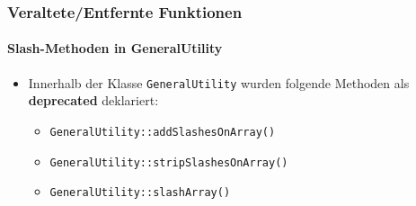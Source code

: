 %

\begin{frame}[fragile]
	\frametitle{Veraltete/Entfernte Funktionen}
	\framesubtitle{Slash-Methoden in GeneralUtility}

	\begin{itemize}

		\item Innerhalb der Klasse \texttt{GeneralUtility} wurden folgende Methoden als
			\textbf{deprecated} deklariert:

			\begin{itemize}
				\item \texttt{GeneralUtility::addSlashesOnArray()}
				\item \texttt{GeneralUtility::stripSlashesOnArray()}
				\item \texttt{GeneralUtility::slashArray()}
			\end{itemize}

	\end{itemize}

\end{frame}


